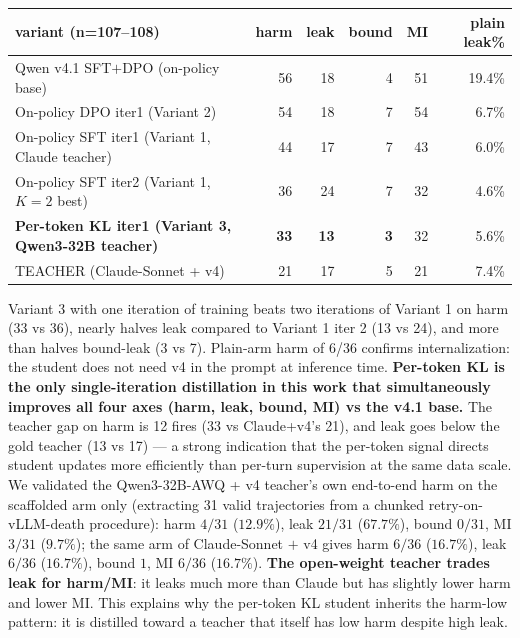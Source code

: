 \documentclass[11pt]{article}
\begin{document}
\begin{center}\small
\begin{tabular}{l r r r r r}
\toprule
variant (n=107--108)                                  & harm  & leak & bound & MI & plain leak\% \\
\midrule
Qwen v4.1 SFT$+$DPO (on-policy base)                  & 56    & 18   & 4     & 51 & 19.4\% \\
On-policy DPO iter1 (Variant 2)                       & 54    & 18   & 7     & 54 & 6.7\% \\
On-policy SFT iter1 (Variant 1, Claude teacher)       & 44    & 17   & 7     & 43 & 6.0\% \\
On-policy SFT iter2 (Variant 1, $K{=}2$ best)         & 36    & 24   & 7     & 32 & 4.6\% \\
\textbf{Per-token KL iter1 (Variant 3, Qwen3-32B teacher)} & \textbf{33} & \textbf{13} & \textbf{3} & 32 & 5.6\% \\
\midrule
TEACHER (Claude-Sonnet + v4)                          & 21    & 17   & 5     & 21 & 7.4\% \\
\bottomrule
\end{tabular}
\end{center}

Variant 3 with one iteration of training beats two iterations of Variant 1 on harm (33 vs 36), nearly halves leak compared to Variant 1 iter 2 (13 vs 24), and more than halves bound-leak (3 vs 7). Plain-arm harm of 6/36 confirms internalization: the student does not need v4 in the prompt at inference time. \textbf{Per-token KL is the only single-iteration distillation in this work that simultaneously improves all four axes (harm, leak, bound, MI) vs the v4.1 base.} The teacher gap on harm is 12 fires (33 vs Claude+v4's 21), and leak goes below the gold teacher (13 vs 17) --- a strong indication that the per-token signal directs student updates more efficiently than per-turn supervision at the same data scale. We validated the Qwen3-32B-AWQ + v4 teacher's own end-to-end harm on the scaffolded arm only (extracting 31 valid trajectories from a chunked retry-on-vLLM-death procedure): harm $4/31$ ($12.9\%$), leak $21/31$ ($67.7\%$), bound $0/31$, MI $3/31$ ($9.7\%$); the same arm of Claude-Sonnet $+$ v4 gives harm $6/36$ ($16.7\%$), leak $6/36$ ($16.7\%$), bound $1$, MI $6/36$ ($16.7\%$). \textbf{The open-weight teacher trades leak for harm/MI}: it leaks much more than Claude but has slightly lower harm and lower MI. This explains why the per-token KL student inherits the harm-low pattern: it is distilled toward a teacher that itself has low harm despite high leak.
\end{document}
